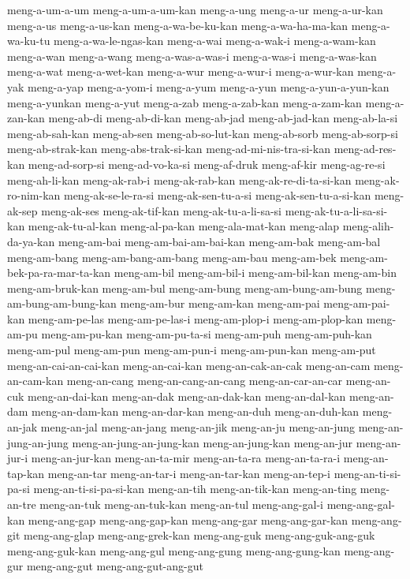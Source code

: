 {meng-a-um-a-um meng-a-um-a-um-kan meng-a-ung meng-a-ur meng-a-ur-kan
meng-a-us meng-a-us-kan meng-a-wa-be-ku-kan meng-a-wa-ha-ma-kan
meng-a-wa-ku-tu meng-a-wa-le-ngas-kan meng-a-wai meng-a-wak-i
meng-a-wam-kan meng-a-wan meng-a-wang meng-a-was-a-was-i meng-a-was-i
meng-a-was-kan meng-a-wat meng-a-wet-kan meng-a-wur meng-a-wur-i
meng-a-wur-kan meng-a-yak meng-a-yap meng-a-yom-i meng-a-yum meng-a-yun
meng-a-yun-a-yun-kan meng-a-yunkan meng-a-yut meng-a-zab meng-a-zab-kan
meng-a-zam-kan meng-a-zan-kan meng-ab-di meng-ab-di-kan meng-ab-jad
meng-ab-jad-kan meng-ab-la-si meng-ab-sah-kan meng-ab-sen
meng-ab-so-lut-kan meng-ab-sorb meng-ab-sorp-si meng-ab-strak-kan
meng-abs-trak-si-kan meng-ad-mi-nis-tra-si-kan meng-ad-res-kan
meng-ad-sorp-si meng-ad-vo-ka-si meng-af-druk meng-af-kir meng-ag-re-si
meng-ah-li-kan meng-ak-rab-i meng-ak-rab-kan meng-ak-re-di-ta-si-kan
meng-ak-ro-nim-kan meng-ak-se-le-ra-si meng-ak-sen-tu-a-si
meng-ak-sen-tu-a-si-kan meng-ak-sep meng-ak-ses meng-ak-tif-kan
meng-ak-tu-a-li-sa-si meng-ak-tu-a-li-sa-si-kan meng-ak-tu-al-kan
meng-al-pa-kan meng-ala-mat-kan meng-alap meng-alih-da-ya-kan meng-am-bai
meng-am-bai-am-bai-kan meng-am-bak meng-am-bal meng-am-bang
meng-am-bang-am-bang meng-am-bau meng-am-bek meng-am-bek-pa-ra-mar-ta-kan
meng-am-bil meng-am-bil-i meng-am-bil-kan meng-am-bin meng-am-bruk-kan
meng-am-bul meng-am-bung meng-am-bung-am-bung meng-am-bung-am-bung-kan
meng-am-bur meng-am-kan meng-am-pai meng-am-pai-kan meng-am-pe-las
meng-am-pe-las-i meng-am-plop-i meng-am-plop-kan meng-am-pu meng-am-pu-kan
meng-am-pu-ta-si meng-am-puh meng-am-puh-kan meng-am-pul meng-am-pun
meng-am-pun-i meng-am-pun-kan meng-am-put meng-an-cai-an-cai-kan
meng-an-cai-kan meng-an-cak-an-cak meng-an-cam meng-an-cam-kan
meng-an-cang meng-an-cang-an-cang meng-an-car-an-car meng-an-cuk
meng-an-dai-kan meng-an-dak meng-an-dak-kan meng-an-dal-kan meng-an-dam
meng-an-dam-kan meng-an-dar-kan meng-an-duh meng-an-duh-kan meng-an-jak
meng-an-jal meng-an-jang meng-an-jik meng-an-ju meng-an-jung
meng-an-jung-an-jung meng-an-jung-an-jung-kan meng-an-jung-kan meng-an-jur
meng-an-jur-i meng-an-jur-kan meng-an-ta-mir meng-an-ta-ra meng-an-ta-ra-i
meng-an-tap-kan meng-an-tar meng-an-tar-i meng-an-tar-kan meng-an-tep-i
meng-an-ti-si-pa-si meng-an-ti-si-pa-si-kan meng-an-tih meng-an-tik-kan
meng-an-ting meng-an-tre meng-an-tuk meng-an-tuk-kan meng-an-tul
meng-ang-gal-i meng-ang-gal-kan meng-ang-gap meng-ang-gap-kan meng-ang-gar
meng-ang-gar-kan meng-ang-git meng-ang-glap meng-ang-grek-kan meng-ang-guk
meng-ang-guk-ang-guk meng-ang-guk-kan meng-ang-gul meng-ang-gung
meng-ang-gung-kan meng-ang-gur meng-ang-gut meng-ang-gut-ang-gut
}
